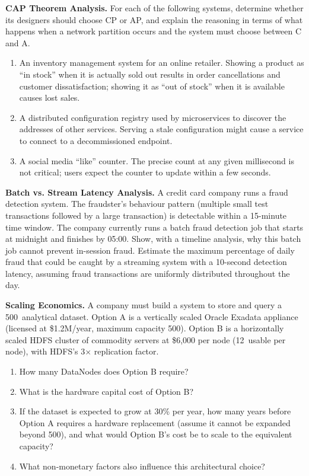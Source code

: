 \ap \textbf{CAP Theorem Analysis.}
For each of the following systems, determine whether its designers should
choose CP or AP, and explain the reasoning in terms of what happens when
a network partition occurs and the system must choose between C and A.
\begin{enumerate}[label=(\alph*)]
  \item An inventory management system for an online retailer. Showing
        a product as ``in stock'' when it is actually sold out results in
        order cancellations and customer dissatisfaction; showing it as
        ``out of stock'' when it is available causes lost sales.
  \item A distributed configuration registry used by microservices to
        discover the addresses of other services. Serving a stale
        configuration might cause a service to connect to a
        decommissioned endpoint.
  \item A social media ``like'' counter. The precise count at any given
        millisecond is not critical; users expect the counter to update
        within a few seconds.
\end{enumerate}

\ap \textbf{Batch vs. Stream Latency Analysis.}
A credit card company runs a fraud detection system. The fraudster's
behaviour pattern (multiple small test transactions followed by a large
transaction) is detectable within a 15-minute time window. The company
currently runs a batch fraud detection job that starts at midnight and
finishes by 05:00. Show, with a timeline analysis, why this batch job
cannot prevent in-session fraud. Estimate the maximum percentage of daily
fraud that could be caught by a streaming system with a 10-second
detection latency, assuming fraud transactions are uniformly distributed
throughout the day.

\ap \textbf{Scaling Economics.}
A company must build a system to store and query a 500\TB\ analytical
dataset. Option A is a vertically scaled Oracle Exadata appliance
(licensed at \$1.2M/year, maximum capacity 500\TB). Option B is a
horizontally scaled HDFS cluster of commodity servers at \$6,000 per node
(12\TB\ usable per node), with HDFS's 3$\times$ replication factor.
\begin{enumerate}[label=(\alph*)]
  \item How many DataNodes does Option B require?
  \item What is the hardware capital cost of Option B?
  \item If the dataset is expected to grow at 30\% per year, how many
        years before Option A requires a hardware replacement (assume
        it cannot be expanded beyond 500\TB), and what would Option B's
        cost be to scale to the equivalent capacity?
  \item What non-monetary factors also influence this architectural choice?
\end{enumerate}

